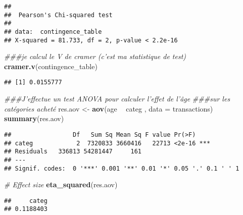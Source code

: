 \documentclass[
]{article}
\newenvironment{Shaded}{\begin{snugshade}}{\end{snugshade}}
\newcommand{\CommentTok}[1]{\textcolor[rgb]{0.56,0.35,0.01}{\textit{#1}}}
\newcommand{\DataTypeTok}[1]{\textcolor[rgb]{0.13,0.29,0.53}{#1}}
\newcommand{\KeywordTok}[1]{\textcolor[rgb]{0.13,0.29,0.53}{\textbf{#1}}}
\newcommand{\NormalTok}[1]{#1}
\newcommand{\OperatorTok}[1]{\textcolor[rgb]{0.81,0.36,0.00}{\textbf{#1}}}
\newcommand{\OtherTok}[1]{\textcolor[rgb]{0.56,0.35,0.01}{#1}}
\newcommand{\StringTok}[1]{\textcolor[rgb]{0.31,0.60,0.02}{#1}}
\begin{document}
\begin{verbatim}
## 
##  Pearson's Chi-squared test
## 
## data:  contingence_table
## X-squared = 81.733, df = 2, p-value < 2.2e-16
\end{verbatim}

\begin{Shaded}
\begin{Highlighting}[]
\CommentTok{###je calcul le V de cramer (c'est ma statistique de test)}
\KeywordTok{cramer.v}\NormalTok{(contingence_table)}
\end{Highlighting}
\end{Shaded}

\begin{verbatim}
## [1] 0.0155777
\end{verbatim}

\begin{Shaded}
\begin{Highlighting}[]
\CommentTok{###J'effectue un test ANOVA pour calculer l'effet de l'âge}
\CommentTok{###sur les catégories acheté}
\NormalTok{res.aov <-}\StringTok{ }\KeywordTok{aov}\NormalTok{(age }\OperatorTok{~}\StringTok{ }\NormalTok{categ , }\DataTypeTok{data =}\NormalTok{ transactions)}
\KeywordTok{summary}\NormalTok{(res.aov)}
\end{Highlighting}
\end{Shaded}

\begin{verbatim}
##                 Df   Sum Sq Mean Sq F value Pr(>F)    
## categ            2  7320833 3660416   22713 <2e-16 ***
## Residuals   336813 54281447     161                   
## ---
## Signif. codes:  0 '***' 0.001 '**' 0.01 '*' 0.05 '.' 0.1 ' ' 1
\end{verbatim}

\begin{Shaded}
\begin{Highlighting}[]
\CommentTok{# Effect size}
\KeywordTok{eta_squared}\NormalTok{(res.aov)}
\end{Highlighting}
\end{Shaded}

\begin{verbatim}
##     categ 
## 0.1188403
\end{verbatim}

\begin{Shaded}
\end{Shaded}
\end{document}
